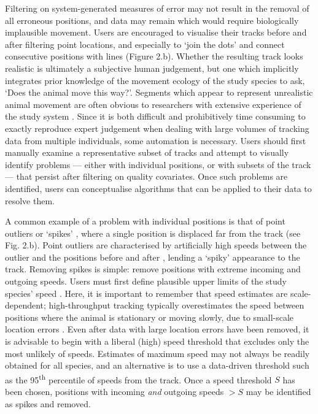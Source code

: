 \documentclass[10pt,paper=a4,headings=standardclasses
]{scrartcl}
\begin{document}
Filtering on system-generated measures of error may not result in the removal of all erroneous positions, and data may remain which would require biologically implausible movement.
Users are encouraged to visualise their tracks before and after filtering point locations, and especially to `join the dots' and connect consecutive positions with lines (Figure 2.b).
Whether the resulting track looks realistic is ultimately a subjective human judgement, but one which implicitly integrates prior knowledge of the movement ecology of the study species to ask, `Does the animal move this way?'.
Segments which appear to represent unrealistic animal movement are often obvious to researchers with extensive experience of the study system \citep[the non-movement approach; see][]{bjorneraas2010}.
Since it is both difficult and prohibitively time consuming to exactly reproduce expert judgement when dealing with large volumes of tracking data from multiple individuals, some automation is necessary.
Users should first manually examine a representative subset of tracks and attempt to visually identify problems --- either with individual positions, or with subsets of the track --- that persist after filtering on quality covariates.
Once such problems are identified, users can conceptualise algorithms that can be applied to their data to resolve them.

A common example of a problem with individual positions is that of point outliers or `spikes' \citep{bjorneraas2010}, where a single position is displaced far from the track (see Fig. 2.b).
Point outliers are characterised by artificially high speeds between the outlier and the positions before and after \citep[called incoming and outgoing speed, respectively;][]{bjorneraas2010}, lending a `spiky' appearance to the track.
Removing spikes is simple: remove positions with extreme incoming and outgoing speeds.
Users must first define plausible upper limits of the study species' speed \citep{calenge2009, seidel2018}.
Here, it is important to remember that speed estimates are scale-dependent; high-throughput tracking typically overestimates the speed between positions where the animal is stationary or moving slowly, due to small-scale location errors \citep{ranacher2016, noonan2019}. 
Even after data with large location errors have been removed, it is advisable to begin with a liberal (high) speed threshold that excludes only the most unlikely of speeds.
Estimates of maximum speed may not always be readily obtained for all species, and an alternative is to use a data-driven threshold such as the 95\textsuperscript{th} percentile of speeds from the track.
Once a speed threshold $S$ has been chosen, positions with incoming \textit{and} outgoing speeds $> S$ may be identified as spikes and removed.
\end{document}
